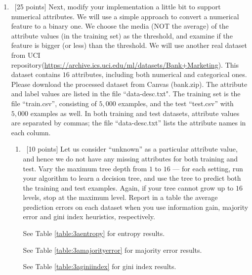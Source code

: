 \documentclass[12pt, fullpage,letterpaper]{article}
\begin{document}
\begin{enumerate}
\item~[25 points] Next, modify your implementation a little bit to support numerical attributes. We will use a simple approach to convert a numerical feature to a binary one. We choose the media (NOT the average) of the attribute values (in the training set) as the threshold, and examine if the feature is bigger (or less) than the threshold. We will use another real dataset from UCI repository(\url{https://archive.ics.uci.edu/ml/datasets/Bank+Marketing}). This dataset contains $16$ attributes, including both numerical and categorical ones. Please download the processed dataset from Canvas (bank.zip).  The attribute and label values are listed in the file ``data-desc.txt". The training set is the file ``train.csv'', consisting of $5,000$ examples, and the test  ``test.csv'' with $5,000$ examples as well.  In both training and test datasets, attribute values are separated by commas; the file ``data-desc.txt''  lists the attribute names in each column. 
\begin{enumerate}
	\item~[10 points] Let us consider ``unknown'' as a particular attribute value, and hence we do not have any missing attributes for both training and test. Vary the maximum  tree depth from $1$ to $16$ --- for each setting, run your algorithm to learn a decision tree, and use the tree to  predict both the training  and test examples. Again, if your tree cannot grow up to $16$ levels, stop at the maximum level. Report in a table the average prediction errors on each dataset when you use information gain, majority error and gini index heuristics, respectively.
	

See Table \ref{table:3aentropy} for entropy results. 

See Table \ref{table:3amajorityerror} for majority error results. 

See Table \ref{table:3aginiindex} for gini index results. 


\end{enumerate}
\end{enumerate}
\end{document}
